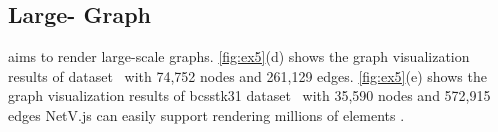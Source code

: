 
\subsection{Large- Graph}
\name aims to render large-scale graphs. \autoref{fig:ex5}(d) shows the graph visualization results of  dataset~\cite{davis2011university} with 74,752 nodes and 261,129 edges. \autoref{fig:ex5}(e) shows the graph visualization results of  bcsstk31 dataset~\cite{davis2011university} with 35,590 nodes and 572,915 edges NetV.js can easily support  rendering millions of elements .




